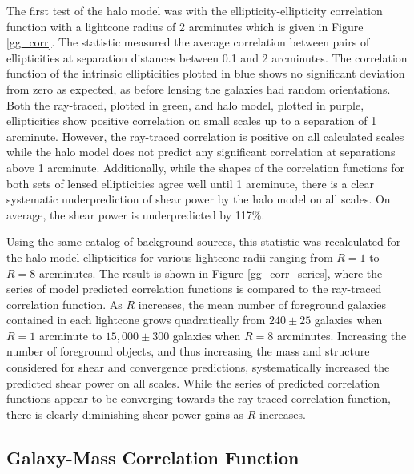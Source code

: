 \documentclass[%
 reprint,
 amsmath,amssymb,
 aps,nofootinbib
]{revtex4-1}
\begin{document}
The first test of the halo model was with the ellipticity-ellipticity correlation function with a lightcone radius of 2 arcminutes which is given in Figure \ref{gg_corr}. The statistic measured the average correlation between pairs of ellipticities at separation distances between 0.1 and 2 arcminutes. The correlation function of the intrinsic ellipticities plotted in blue shows no significant deviation from zero as expected, as before lensing the galaxies had random orientations. Both the ray-traced, plotted in green, and halo model, plotted in purple, ellipticities show positive correlation on small scales up to a separation of 1 arcminute. However, the ray-traced correlation is positive on all calculated scales while the halo model does not predict any significant correlation at separations above 1 arcminute. Additionally, while the shapes of the correlation functions for both sets of lensed ellipticities agree well until 1 arcminute, there is a clear systematic underprediction of shear power by the halo model on all scales. On average, the shear power is underpredicted by 117\%.

Using the same catalog of background sources, this statistic was recalculated for the halo model ellipticities for various lightcone radii ranging from $R=1$ to $R=8$ arcminutes. The result is shown in Figure \ref{gg_corr_series}, where the series of model predicted correlation functions is compared to the ray-traced correlation function. As $R$ increases, the mean number of foreground galaxies contained in each lightcone grows quadratically from ${240\pm25}$ galaxies when $R=1$ arcminute to ${15,000\pm300}$ galaxies when $R=8$ arcminutes. Increasing the number of foreground objects, and thus increasing the mass and structure considered for shear and convergence predictions, systematically increased the predicted shear power on all scales. While the series of predicted correlation functions appear to be converging towards the ray-traced correlation function, there is clearly diminishing shear power gains as $R$ increases.

\subsection*{Galaxy-Mass Correlation Function}
\end{document}
